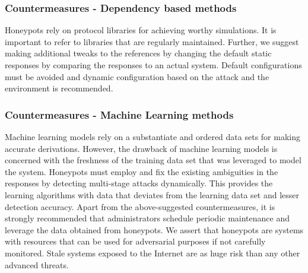 \subsubsection{Countermeasures - Dependency based methods}
Honeypots rely on protocol libraries for achieving worthy simulations. It is important to refer to libraries that are regularly maintained. Further, we suggest making additional tweaks to the references by changing the default static responses by comparing the responses to an actual system. Default configurations must be avoided and dynamic configuration based on the attack and the environment is recommended. 

\subsubsection{Countermeasures - Machine Learning methods}
Machine learning models rely on a substantiate and ordered data sets for making accurate derivations. However, the drawback of machine learning models is concerned with the freshness of the training data set that was leveraged to model the system. Honeypots must employ and fix the existing ambiguities in the responses by detecting multi-stage attacks dynamically. This provides the learning algorithms with data that deviates from the learning data set and lesser detection accuracy.
\newline
Apart from the above-suggested countermeasures, it is strongly recommended that administrators schedule periodic maintenance and leverage the data obtained from honeypots. We assert that honeypots are systems with resources that can be used for adversarial purposes if not carefully monitored. Stale systems exposed to the Internet are as huge risk than any other advanced threats. 

